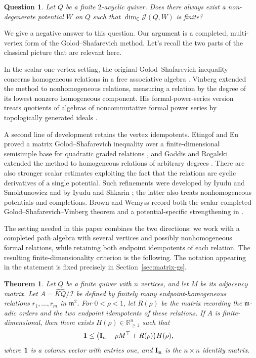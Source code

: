 \documentclass[11pt,letterpaper,reqno]{amsart}
\newtheorem{theorem}{Theorem}[section]
\newtheorem{question}[question]{Question}
\theoremstyle{definition}
\newcommand{\one}{\mathbf 1}
\newcommand{\Jac}{\mathcal J}
\begin{document}
	\begin{question}
		\label{question:schroer}
		Let $Q$ be a finite $2$-acyclic quiver.  Does there always exist a
		non-degenerate potential $W$ on $Q$ such that $\dim_{\mathbb C}\Jac(Q,W)$ is
		finite?
	\end{question}
	
	We give a negative answer to this question.  Our argument is a completed, multi-vertex form of
	the Golod--Shafarevich method.  Let's recall the two parts of the classical
	picture that are relevant here.
	
	In the scalar one-vertex setting, the original Golod--Shafarevich inequality
	concerns homogeneous relations in a free associative algebra
	\cite{GolodShafarevich,Golod}.  Vinberg extended the method to
	nonhomogeneous relations, measuring a relation by the degree of its lowest
	nonzero homogeneous component.  His formal-power-series version
	treats quotients of algebras of noncommutative formal power series by
	topologically generated ideals \cite{Vinberg}.  
	
	A second line of development retains the vertex idempotents.  Etingof and Eu
	proved a matrix Golod--Shafarevich inequality over a finite-dimensional
	semisimple base for quadratic graded relations
	\cite{EtingofEu}, and Gaddis and Rogalski extended the method
	to homogeneous relations of arbitrary degrees \cite{GaddisRogalski}.
	There are also stronger scalar estimates exploiting the fact that the
	relations are cyclic derivatives of a single potential.  Such refinements
	were developed by Iyudu and Smoktunowicz and by Iyudu and Shkarin
	\cite{IyuduSmoktunowicz,IyuduShkarin}; the latter also treats
	nonhomogeneous potentials and completions.  Brown and Wemyss record both the
	scalar completed Golod--Shafarevich--Vinberg theorem and a
	potential-specific strengthening in \cite{BrownWemyss}.
	
	The setting needed in this paper combines the two directions: we work with a
	completed path algebra with several vertices and possibly nonhomogeneous
	formal relations, while retaining both endpoint idempotents of each
	relation.  The resulting finite-dimensionality criterion is the following.
	The notation appearing in the statement is fixed precisely in
	Section~\ref{sec:matrix-gs}.
	
	\begin{theorem}
		\label{theorem:completed-matrix-gs}
Let $Q$ be a finite quiver with $n$ vertices, and let $M$ be its
adjacency matrix. Let
$A=\widehat{KQ}/\mathcal I$ be defined by finitely many
endpoint-homogeneous relations $r_1,\ldots,r_m$ in
$\mathfrak m^2$.
For $0<\rho<1$, let $R(\rho)$ be
		the matrix recording the $\mathfrak m$-adic orders and the two endpoint
		idempotents of these relations.  If $A$ is finite-dimensional, then there
		exists $H(\rho)\in\mathbb R_{\geq1}^{n}$ such that
		\begin{equation}
			\label{eq:completed-matrix-gs}
			\one\leq
			\bigl({\bf I}_{n}-\rho M^{\top}+R(\rho)\bigr)H(\rho),
		\end{equation}
		where $\bf 1$ is a column vector with entries one, and $\bf I_n$ is the $n\times n$ identity matrix. 
	\end{theorem}
	
\end{document}

